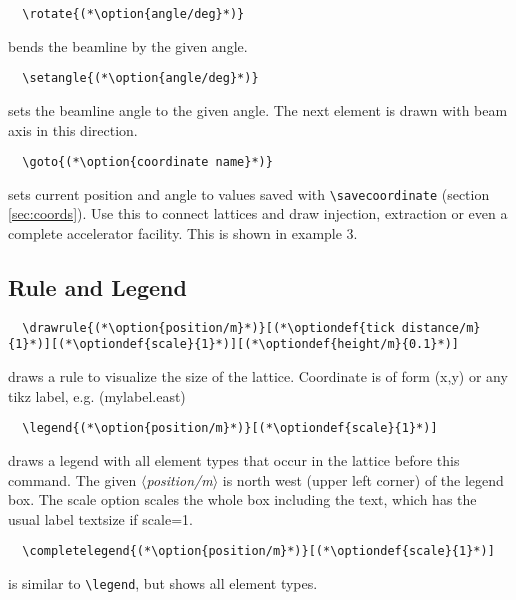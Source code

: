 \documentclass[a4paper]{scrartcl}
\newcommand{\option}[1]{{\color{blue}$\langle$\textit{#1}$\rangle$}}
\newcommand{\optiondef}[2]{{\color{green!50!black}$\langle$\textit{#1=#2}$\rangle$}}
\begin{document}
\begin{lstlisting}
  \rotate{(*\option{angle/deg}*)}
\end{lstlisting}
bends the beamline by the given angle.

\begin{lstlisting}
  \setangle{(*\option{angle/deg}*)}
\end{lstlisting}
sets the beamline angle to the given angle. The next element is drawn with beam axis in
this direction.

\begin{lstlisting}
  \goto{(*\option{coordinate name}*)}
\end{lstlisting}
sets current position and angle to values saved
with \lstinline+\savecoordinate+ (section \ref{sec:coords}).
Use this to connect lattices and draw injection, extraction or even a complete accelerator
facility. This is shown in example 3.



\subsection{Rule and Legend}
\label{sec:rule-legend}

\begin{lstlisting}
  \drawrule{(*\option{position/m}*)}[(*\optiondef{tick distance/m}{1}*)][(*\optiondef{scale}{1}*)][(*\optiondef{height/m}{0.1}*)]
\end{lstlisting}
draws a rule to visualize the size of the lattice. Coordinate is of form (x,y) or any tikz
label, e.g. (mylabel.east)

\begin{lstlisting}
  \legend{(*\option{position/m}*)}[(*\optiondef{scale}{1}*)]
\end{lstlisting}
draws a legend with all element types that occur in the lattice before this command.
The given \option{position/m} is north west (upper left corner) of the legend box.
The scale option scales the whole box including the text, which has the usual label
textsize if scale=1.

\begin{lstlisting}
  \completelegend{(*\option{position/m}*)}[(*\optiondef{scale}{1}*)]
\end{lstlisting}
is similar to \lstinline+\legend+, but shows all element types.
\end{document}
